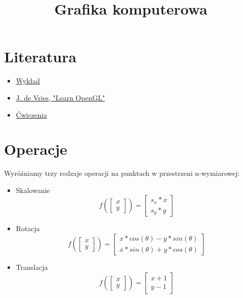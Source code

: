 \documentclass{../notatki}
\title{Grafika komputerowa}
\begin{document}
\tableofcontents

\section{Literatura}

\begin{itemize}
    \item \href{https://wp.faculty.wmi.amu.edu.pl/GRK.html}{Wykład}
    \item \href{https://learnopengl.com/book/book_pdf.pdf}{J. de Vries, "Learn OpenGL"}
    \item \href{https://andkok.faculty.wmi.amu.edu.pl/grk/zad_1/}{Ćwiczenia}
\end{itemize}

\section{Operacje}

Wyróżniamy trzy rodzaje operacji na punktach w przestrzeni n-wymiarowej:

\begin{itemize}
    \item Skalowanie\\
    $$
    f(
        \begin{bmatrix}
        x \\
        y
        \end{bmatrix}
    )
    =
    \begin{bmatrix}
        s_x * x \\
        s_y * y
    \end{bmatrix}
    $$
    \item Rotacja\\
    $$
    f(
        \begin{bmatrix}
        x \\
        y
        \end{bmatrix}
    )
    =
    \begin{bmatrix}
        x * cos(\theta) - y * sin(\theta) \\
        x * sin(\theta) + y * cos(\theta)
    \end{bmatrix}
    $$
    \item Translacja\\
    $$
    f(
        \begin{bmatrix}
        x \\
        y
        \end{bmatrix}
    )
    =
    \begin{bmatrix}
        x + 1 \\
        y - 1
    \end{bmatrix}
    $$
\end{itemize}
\end{document}
